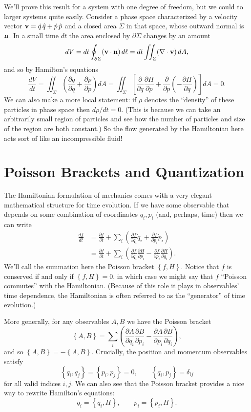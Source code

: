 \documentclass[../p111main.tex]{subfiles}
\begin{document}
We'll prove this result for a system with one degree of freedom, but we could to larger systems quite easily.
Consider a phase space characterized by a velocity vector $\mathbf{v} = \dot q \, \hat q + \dot p \, \hat p$ and a closed area $\Sigma$ in that space, whose outward normal is $\mathbf{n}$.
In a small time $dt$ the area enclosed by $\partial \Sigma$ changes by an amount
\[ dV = dt \oint_{\partial \Sigma} (\mathbf{v} \cdot \mathbf{n}) \,d\ell = dt \iint_\Sigma (\nabla \cdot \mathbf{v}) \,dA, \]
and so by Hamilton's equations
\[ \frac{dV}{dt} = \iint_\Sigma \left( \frac{\partial \dot q}{\partial q} + \frac{\partial \dot p}{\partial p} \right) dA = \iint_\Sigma \left[ \frac{\partial}{\partial q} \frac{\partial H}{\partial p} + \frac{\partial}{\partial p} \left( - \frac{\partial H}{\partial q} \right) \right] dA = 0. \]
We can also make a more local statement: if $\rho$ denotes the ``density'' of these particles in phase space then $d \rho / dt = 0$.
(This is because we can take an arbitrarily small region of particles and see how the number of particles and size of the region are both constant.)
So the flow generated by the Hamiltonian here acts sort of like an incompressible fluid!

\section{Poisson Brackets and Quantization}
The Hamiltonian formulation of mechanics comes with a very elegant mathematical structure for time evolution.
If we have some observable that depends on some combination of coordinates $q_i, p_i$ (and, perhaps, time) then we can write
\begin{align*}
    \frac{df}{dt} &= \frac{\partial f}{\partial t} + \sum_{i}^{} \left( \frac{\partial f}{\partial q_i} \dot q_i + \frac{\partial f}{\partial p_i} \dot p_i \right) \\
    &= \frac{\partial f}{\partial t} + \sum_{i}^{} \left( \frac{\partial f}{\partial q_i} \frac{\partial H}{\partial p_i} - \frac{\partial f}{\partial p_i} \frac{\partial H}{\partial q_i} \right).
\end{align*}
We'll call the summation here the Poisson bracket $\left\{ f, H \right\}$.
Notice that $f$ is conserved if and only if $\left\{ f, H \right\} = 0$, in which case we might say that $f$ ``Poisson commutes'' with the Hamiltonian.
(Because of this role it plays in observables' time dependence, the Hamiltonian is often referred to as the ``generator'' of time evolution.)

More generally, for any observables $A,B$ we have the Poisson bracket
\[ \left\{ A,B \right\} = \sum_{i}^{} \left( \frac{\partial A}{\partial q_i} \frac{\partial B}{\partial p_i} - \frac{\partial A}{\partial p_i} \frac{\partial B}{\partial q_i} \right), \]
and so $\left\{ A,B \right\} = -\left\{ A,B \right\}$.
Crucially, the position and momentum observables satisfy
\[ \left\{ q_i, q_j \right\} = \left\{ p_i, p_j \right\} = 0, \qquad \left\{ q_i, p_j \right\} = \delta_{ij} \]
for all valid indices $i,j$.
We can also see that the Poisson bracket provides a nice way to rewrite Hamilton's equations:
\[ \dot q_i = \left\{ q_i, H \right\}, \qquad \dot p_i = \left\{ p_i, H \right\}. \]
\end{document}
